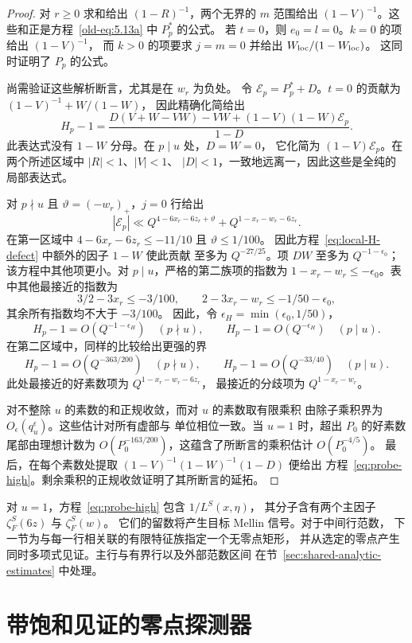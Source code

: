 \documentclass[11pt,a4paper]{article}
\numberwithin{equation}{section}
\numberwithin{figure}{section}
\theoremstyle{definition}
\theoremstyle{remark}
\begin{document}
\begin{proof}
对 $r\ge0$ 求和给出 $(1-R)^{-1}$，两个无界的 $m$ 范围给出
$(1-V)^{-1}$。这些和正是方程~\eqref{old-eq:5.13a} 中 $P_p^*$ 的公式。
若 $t=0$，则 $e_0=l=0$。$k=0$ 的项给出 $(1-V)^{-1}$，
而 $k>0$ 的项要求 $j=m=0$ 并给出 $W_{\rm loc}/(1-W_{\rm loc})$。
这同时证明了 $P_p$ 的公式。

尚需验证这些解析断言，尤其是在 $w_r$ 为负处。
令 $\mathcal E_p=P_p^*+D$。$t=0$ 的贡献为 $(1-V)^{-1}+W/(1-W)$，
因此精确化简给出
\begin{equation}\label{eq:local-H-defect}
 H_p-1=
 \frac{D(V+W-VW)-VW+(1-V)(1-W)\mathcal E_p}{1-D}.
\end{equation}
此表达式没有 $1-W$ 分母。在 $p\mid u$ 处，$D=W=0$，
它化简为 $(1-V)\mathcal E_p$。在两个所述区域中 $|R|<1$、$|V|<1$、
$|D|<1$，一致地远离一，因此这些是全纯的局部表达式。

对 $p\nmid u$ 且 $\vartheta=(-w_r)_+$，$j=0$ 行给出
\[
 |\mathcal E_p|\ll
 Q^{4-6x_r-6z_r+\vartheta}+Q^{1-x_r-w_r-6z_r}.
\]
在第一区域中 $4-6x_r-6z_r\le-11/10$ 且 $\vartheta\le1/100$。
因此方程~\eqref{eq:local-H-defect} 中额外的因子 $1-W$ 使此贡献
至多为 $Q^{-27/25}$。项 $DW$ 至多为 $Q^{-1-\epsilon_0}$；
该方程中其他项更小。对 $p\mid u$，严格的第二族项的指数为
$1-x_r-w_r\le-\epsilon_0$。表中其他最接近的指数为
\[
 3/2-3x_r\le-3/100,\qquad
 2-3x_r-w_r\le-1/50-\epsilon_0,
\]
其余所有指数均不大于 $-3/100$。
因此，令 $\epsilon_H=\min(\epsilon_0,1/50)$，
\[
 H_p-1=O(Q^{-1-\epsilon_H})\quad(p\nmid u),\qquad
 H_p-1=O(Q^{-\epsilon_H})\quad(p\mid u).
\]
在第二区域中，同样的比较给出更强的界
\[
 H_p-1=O(Q^{-363/200})\quad(p\nmid u),\qquad
 H_p-1=O(Q^{-33/40})\quad(p\mid u).
\]
此处最接近的好素数项为 $Q^{1-x_r-w_r-6z_r}$，
最接近的分歧项为 $Q^{1-x_r-w_r}$。

对不整除 $u$ 的素数的和正规收敛，而对 $u$ 的素数取有限乘积
由除子乘积界为 $O_\epsilon(q_u^\epsilon)$。这些估计对所有虚部与
单位相位一致。当 $u=1$ 时，超出 $P_0$ 的好素数尾部由理想计数为
$O(P_0^{-163/200})$，这蕴含了所断言的乘积估计 $O(P_0^{-4/5})$。
最后，在每个素数处提取 $(1-V)^{-1}(1-W)^{-1}(1-D)$ 便给出
方程~\eqref{eq:probe-high}。剩余乘积的正规收敛证明了其所断言的延拓。
\end{proof}

对 $u=1$，方程~\eqref{eq:probe-high} 包含 $1/L^S(x,\eta)$，
其分子含有两个主因子 $\zeta_F^S(6z)$ 与 $\zeta_F^S(w)$。
它们的留数将产生目标 Mellin 信号。对于中间行范数，
下一节为与每一行相关联的有限特征族指定一个无零点矩形，
并从选定的零点产生同时多项式见证。主行与有界行以及外部范数区间
在节~\ref{sec:shared-analytic-estimates} 中处理。

\section{带饱和见证的零点探测器}\label{sec:detector}
\end{document}
